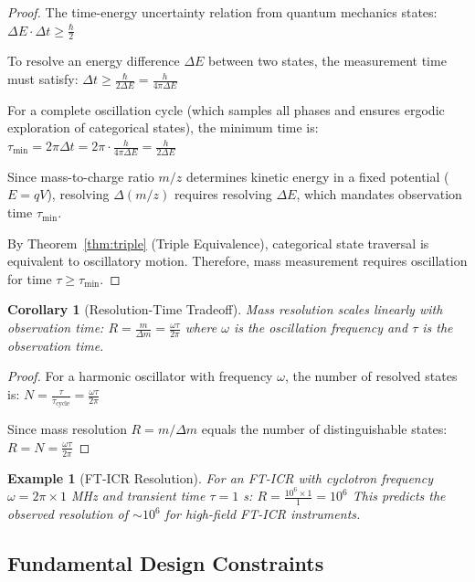 \documentclass[twocolumn,10pt]{article}
\newtheorem{corollary}[theorem]{Corollary}
\newtheorem{example}[theorem]{Example}
\begin{document}
\begin{proof}
The time-energy uncertainty relation from quantum mechanics states:
$
\Delta E \cdot \Delta t \geq \frac{\hbar}{2}
$

To resolve an energy difference $\Delta E$ between two states, the measurement time must satisfy:
$
\Delta t \geq \frac{\hbar}{2\Delta E} = \frac{h}{4\pi \Delta E}
$

For a complete oscillation cycle (which samples all phases and ensures ergodic exploration of categorical states), the minimum time is:
$
\tau_{\min} = 2\pi \Delta t = 2\pi \cdot \frac{h}{4\pi \Delta E} = \frac{h}{2\Delta E}
$

Since mass-to-charge ratio $m/z$ determines kinetic energy in a fixed potential ($E = qV$), resolving $\Delta(m/z)$ requires resolving $\Delta E$, which mandates observation time $\tau_{\min}$.

By Theorem~\ref{thm:triple} (Triple Equivalence), categorical state traversal is equivalent to oscillatory motion. Therefore, mass measurement requires oscillation for time $\tau \geq \tau_{\min}$.
\end{proof}

\begin{corollary}[Resolution-Time Tradeoff]
\label{cor:resolution_time}
Mass resolution scales linearly with observation time:
$
R = \frac{m}{\Delta m} = \frac{\omega \tau}{2\pi}
$
where $\omega$ is the oscillation frequency and $\tau$ is the observation time.
\end{corollary}

\begin{proof}
For a harmonic oscillator with frequency $\omega$, the number of resolved states is:
$
N = \frac{\tau}{\tau_{\mathrm{cycle}}} = \frac{\omega \tau}{2\pi}
$

Since mass resolution $R = m/\Delta m$ equals the number of distinguishable states:
$
R = N = \frac{\omega \tau}{2\pi}
$
\end{proof}

\begin{example}[FT-ICR Resolution]
\label{ex:fticr_resolution}
For an FT-ICR with cyclotron frequency $\omega = 2\pi \times 1$ MHz and transient time $\tau = 1$ s:
$
R = \frac{10^6 \times 1}{1} = 10^6
$
This predicts the observed resolution of $\sim 10^6$ for high-field FT-ICR instruments.
\end{example}

\subsection{Fundamental Design Constraints}
\end{document}
